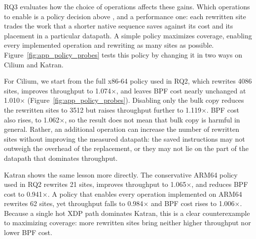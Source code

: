 RQ3 evaluates how the choice of \lang operations affects these gains.
Which \lang operations to enable is a policy decision above \tool, and a performance one: each rewritten site trades the work that a shorter native sequence saves against its cost and its placement in a particular datapath.
A simple policy maximizes coverage, enabling every implemented \lang operation and rewriting as many sites as possible.
Figure~\ref{fig:app_policy_probes} tests this policy by changing it in two ways on Cilium and Katran.



For Cilium, we start from the full x86-64 policy used in RQ2, which rewrites 4086 sites, improves throughput to 1.074$\times$, and leaves BPF cost nearly unchanged at 1.010$\times$ (Figure~\ref{fig:app_policy_probes}).
Disabling only the \lang bulk copy reduces the rewritten sites to 3512 but raises throughput further to 1.119$\times$.
BPF cost also rises, to 1.062$\times$, so the result does not mean that bulk copy is harmful in general.
Rather, an additional \lang operation can increase the number of rewritten sites without improving the measured datapath: the saved instructions may not outweigh the overhead of the replacement, or they may not lie on the part of the datapath that dominates throughput.

Katran shows the same lesson more directly.
The conservative ARM64 policy used in RQ2 rewrites 21 sites, improves throughput to 1.065$\times$, and reduces BPF cost to 0.941$\times$.
A policy that enables every \lang operation implemented on ARM64 rewrites 62 sites, yet throughput falls to 0.984$\times$ and BPF cost rises to 1.006$\times$.
Because a single hot XDP path dominates Katran, this is a clear counterexample to maximizing coverage: more rewritten sites bring neither higher throughput nor lower BPF cost.

